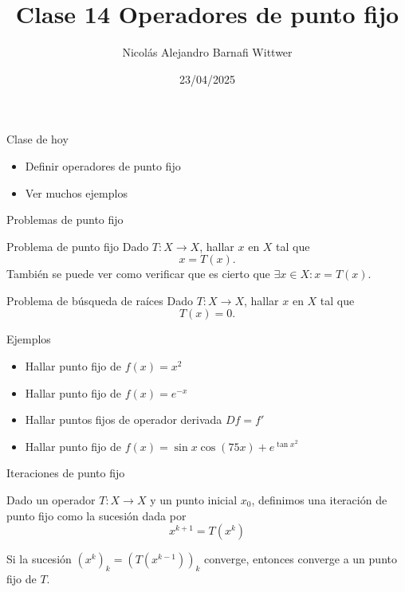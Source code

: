 \documentclass[12pt,aspectratio=169,xcolor=dvipsnames]{beamer}
\title[short title]{Clase 14 Operadores de punto fijo}
\subtitle{}
\author[NA Barnafi] {Nicolás Alejandro Barnafi Wittwer}
\institute[UC|CMM] 
{
    Pontificia Universidad Católica de Chile \\
    Centro de Modelamiento Matemático
}
\date{23/04/2025}
\begin{document}
\begin{frame}
    \maketitle
\end{frame}
\begin{frame}{Clase de hoy}
    \begin{itemize}
        \item Definir operadores de punto fijo
        \item Ver muchos ejemplos
    \end{itemize}
\end{frame}
\begin{frame}{Problemas de punto fijo}
    \begin{block}{Problema de punto fijo}
        Dado $T:X\to X$, hallar $x$ en $X$ tal que
            $$ x = T(x).$$
        También se puede ver como verificar que es cierto que $\exists x\in X: x=T(x)$.
    \end{block}

    \pause \begin{block}{Problema de búsqueda de raíces}
        Dado $T:X\to X$, hallar $x$ en $X$ tal que
            $$ T(x)=0.$$
    \end{block}
\end{frame}
\begin{frame}{Ejemplos}
    \begin{itemize}
        \item<+-> Hallar punto fijo de $f(x) = x^2$
        \item<+-> Hallar punto fijo de $f(x) = e^{-x}$
        \item<+-> Hallar puntos fijos de operador derivada $D f= f'$
        \item<+-> Hallar punto fijo de $f(x) = \sin x \cos (75 x) + e^{\tan x^2}$
    \end{itemize}
    \pause {}
\end{frame}
\begin{frame}{Iteraciones de punto fijo}
    \begin{block}{}
        Dado un operador $T:X\to X$ y un punto inicial $x_0$, definimos una iteración de punto fijo como la sucesión dada por
            $$ x^{k+1} = T(x^k)$$
    \end{block}
    Si la sucesión $(x^k)_k = (T(x^{k-1}))_k$ converge, entonces converge a un punto fijo de $T$.

    \pause {}
\end{frame}
\end{document}
